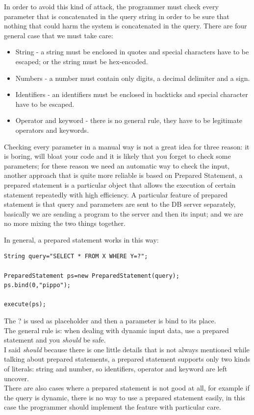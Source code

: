 In order to avoid this kind of attack, the programmer must check every parameter that is concatenated in the query string in order to be sure that nothing that could harm
the system is concatenated in the query.\newline
There are four general case that we must take care:
\begin{itemize}
	\item String - a string must be enclosed in quotes and special characters have to be escaped; or the string must be hex-encoded.
	\item Numbers - a number must contain only digits, a decimal delimiter and a sign.
	\item Identifiers - an identifiers must be enclosed in backticks and special character have to be escaped.
	\item Operator and keyword - there is no general rule, they have to be legitimate operators and keywords.
\end{itemize}

Checking every parameter in a manual way is not a great idea for three reason: it is boring, will bloat your code and it is likely that you forget to check
some parameters; for these reason we need an automatic way to check the input, another approach that is quite more reliable is based on Prepared Statement,
a prepared statement is a particular object that allows the execution of certain statement repeatedly with high efficiency.\newline
A particular feature of prepared statement is that query and parameters are sent to the DB server separately, basically we are sending a program to the server and then its input;
and we are no more mixing the two things together.\newline

In general, a prepared statement works in this way:

\begin{lstlisting}
String query="SELECT * FROM X WHERE Y=?";

PreparedStatement ps=new PreparedStatement(query);
ps.bind(0,"pippo");

execute(ps);
\end{lstlisting}

The ? is used as placeholder and then a parameter is bind to its place.\\

The general rule is: when dealing with dynamic input data, use a prepared statement and you \emph{should} be safe.\\
I said \emph{should} because there is one little details that is not always mentioned while talking about prepared statements,
a prepared statement supports only two kinds of literals: string and number, so identifiers, operator and keyword are left uncover.\cite{phpinj}\\
There are also cases where a prepared statement is not good at all, for example if the query is dynamic, there is no way to use a prepared statement
easily, in this case the programmer should implement the feature with particular care.\\

